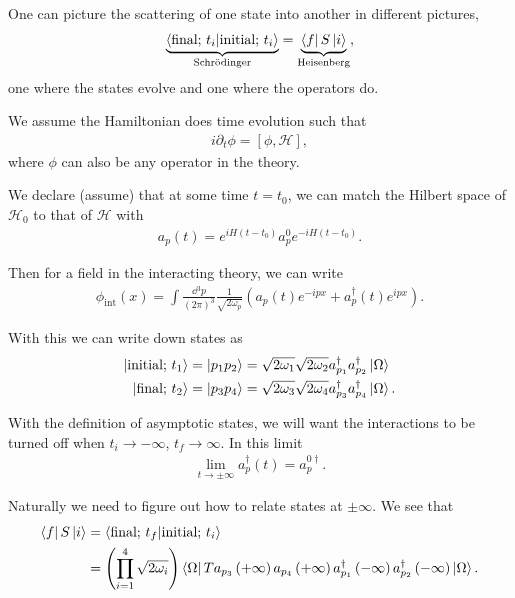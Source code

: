 
One can picture the scattering of one state into another in different pictures,
\begin{align}
    \underbrace{\bra{\text{final;}~t_i} \ket{\text{initial;}~t_i}}_{\text{Schrödinger}}  = \underbrace{\bra{f} S \ket{i}}_{\text{Heisenberg}}
,\end{align}
one where the states evolve and one where the operators do.

We assume the Hamiltonian does time evolution such that
\begin{align}
    i \partial_t \phi = \left[ \phi, \mathcal{H} \right] 
,\end{align}
where $\phi$ can also be any operator in the theory.

We declare (assume) that at some time $t = t_0$, we can match the Hilbert space of $\mathcal{H}_0$ to that of $\mathcal{H}$ with
\begin{align}
    a_p \left( t \right) = e^{i H \left( t - t_0 \right) } a^{0}_p e^{-i H \left( t - t_0 \right) }
.\end{align}

Then for a field in the interacting theory, we can write
\begin{align}
    \phi_\text{int} \left( x \right) = \int \frac{\dd{^3p}}{\left( 2\pi \right)^3} \frac{1}{\sqrt{2 \omega_p} } \left( a_p \left( t \right) e^{-i p x} + a_p^{\dag} \left( t \right) e^{i p x} \right) 
.\end{align}

With this we can write down states as
\begin{align}
    \ket{\text{initial; }t_1} &= \ket{p_1 p_2} = \sqrt{2 \omega_1 }  \sqrt{2 \omega_2}  a^{\dag}_{p_1} a^{\dag}_{p_2} \ket{\Omega} \\
    \ket{\text{final; }t_2} &= \ket{p_3 p_4} = \sqrt{2 \omega_3 }  \sqrt{2 \omega_4}  a^{\dag}_{p_3} a^{\dag}_{p_4} \ket{\Omega}
.\end{align}

With the definition of asymptotic states, we will want the interactions to be turned off when $t_i \to - \infty$, $t_f \to \infty$. In this limit
\begin{align}
    \lim_{t \to \pm\infty}  a^{\dag}_p\left( t \right) = a_p^{0\dag}
.\end{align}

Naturally we need to figure out how to relate states at $\pm \infty$. We see that
\begin{align}
    \bra{f} S \ket{i} &= \bra{\text{final; }t_f} \ket{\text{initial; } t_i} \\
    &= \left( \prod_{i = 1}^{4} \sqrt{2 \omega_i}   \right) \bra{\Omega} T a_{p_3} \left( + \infty \right) a_{p_4} \left( + \infty \right) a_{p_1}^{\dag} \left( - \infty \right) a_{p_2}^{\dag} \left( - \infty \right) \ket{\Omega}
.\end{align}

